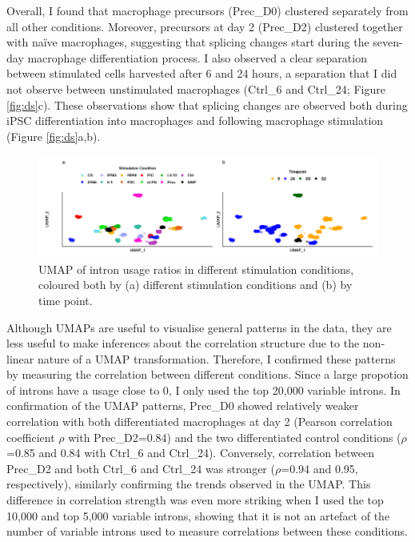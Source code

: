 Overall, I found that macrophage precursors (Prec\_D0) clustered separately from all other conditions. Moreover, precursors at day 2 (Prec\_D2) clustered together with naïve macrophages, suggesting that splicing changes start during the seven-day macrophage differentiation process. I also observed a clear separation between stimulated cells harvested after 6 and 24 hours, a separation that I did not observe between unstimulated macrophages (Ctrl\_6 and Ctrl\_24; Figure \ref{fig:ds}c). These observations show that splicing changes are observed both during iPSC differentiation into macrophages and following macrophage stimulation (Figure \ref{fig:ds}a,b). \\


\begin{figure}[H]
  \centering
  \includegraphics[width=\textwidth]{Vector/umap.png}
  \caption{ UMAP of intron usage ratios in different stimulation conditions, coloured both by (a) different stimulation conditions and (b) by time point.}
  \label{fig:umap}   
\end{figure}
Although UMAPs are useful to visualise general patterns in the data, they are less useful to make inferences about the correlation structure due to the non-linear nature of a UMAP transformation. Therefore, I confirmed these patterns by measuring the correlation between different conditions. Since a large propotion of introns have a usage close to 0, I only used the top 20,000 variable introns. In confirmation of the UMAP patterns, Prec\_D0 showed relatively weaker correlation with both differentiated macrophages at day 2 (Pearson correlation coefficient $\rho$ with Prec\_D2=0.84) and the two differentiated control conditions ($\rho$=0.85 and 0.84 with Ctrl\_6 and Ctrl\_24). Conversely, correlation between Prec\_D2 and both Ctrl\_6 and Ctrl\_24 was stronger ($\rho$=0.94 and 0.95, respectively), similarly confirming the trends observed in the UMAP. This difference in correlation strength was even more striking when I used the top 10,000 and top 5,000 variable introns, showing that it is not an artefact of the number of variable introns used to measure correlations between these conditions.\\

